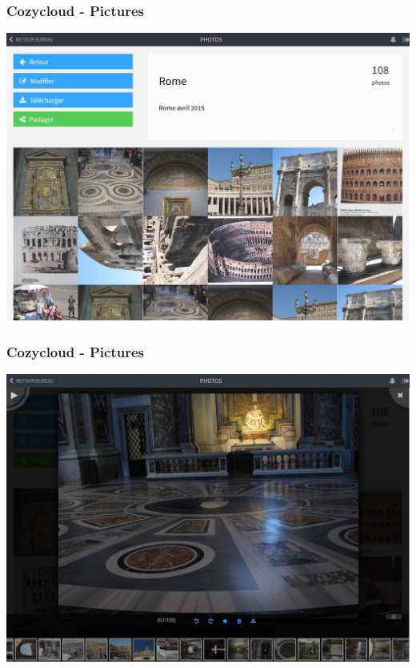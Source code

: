 \documentclass{beamer}
\begin{document}
\begin{frame}
\frametitle{Cozycloud  - Pictures}
\includegraphics[scale=0.3] {./CozyCloud/CozyCloud_Photos.jpg}
\end{frame}
\begin{frame}
\frametitle{Cozycloud   - Pictures}
\includegraphics[scale=0.3] {./CozyCloud/CozyCloud_Photos_01.jpg}
\end{frame}
\end{document}
